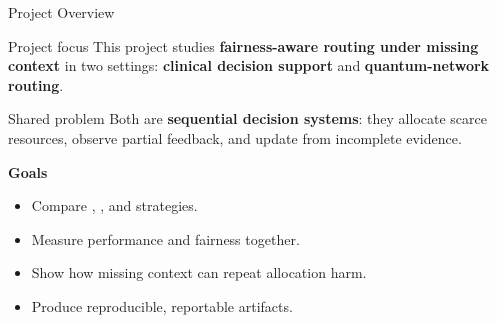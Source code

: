 
\begin{frame}{Project Overview}
\begin{block}{Project focus}
This project studies \textbf{fairness-aware routing under missing context} in two settings: \textbf{clinical decision support} and \textbf{quantum-network routing}.
\end{block}
\begin{block}{Shared problem}
Both are \textbf{sequential decision systems}: they allocate scarce resources, observe partial feedback, and update from incomplete evidence.
\end{block}
\textbf{Goals}
\begin{itemize}
    \item Compare \mab, \cmab, and \icmab{} strategies.
    \item Measure performance and fairness together.
    \item Show how missing context can repeat allocation harm.
    \item Produce reproducible, reportable artifacts.
\end{itemize}
\end{frame}

